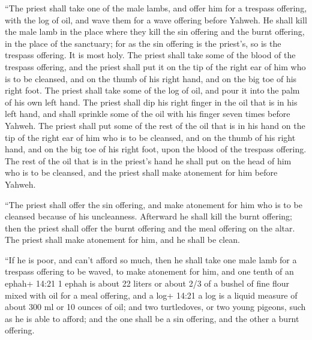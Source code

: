  ``The priest shall take one of the male lambs, and offer
him for a trespass offering, with the log of oil, and wave them for a
wave offering before Yahweh.  He shall kill the male lamb
in the place where they kill the sin offering and the burnt offering, in
the place of the sanctuary; for as the sin offering is the priest's, so
is the trespass offering. It is most holy.  The priest
shall take some of the blood of the trespass offering, and the priest
shall put it on the tip of the right ear of him who is to be cleansed,
and on the thumb of his right hand, and on the big toe of his right
foot.  The priest shall take some of the log of oil, and
pour it into the palm of his own left hand.  The priest
shall dip his right finger in the oil that is in his left hand, and
shall sprinkle some of the oil with his finger seven times before
Yahweh.  The priest shall put some of the rest of the oil
that is in his hand on the tip of the right ear of him who is to be
cleansed, and on the thumb of his right hand, and on the big toe of his
right foot, upon the blood of the trespass offering.  The
rest of the oil that is in the priest's hand he shall put on the head of
him who is to be cleansed, and the priest shall make atonement for him
before Yahweh.

 ``The priest shall offer the sin offering, and make
atonement for him who is to be cleansed because of his uncleanness.
Afterward he shall kill the burnt offering;  then the
priest shall offer the burnt offering and the meal offering on the
altar. The priest shall make atonement for him, and he shall be clean.

 ``If he is poor, and can't afford so much, then he shall
take one male lamb for a trespass offering to be waved, to make
atonement for him, and one tenth of an ephah+ 14:21 1 ephah is about 22
liters or about 2/3 of a bushel of fine flour mixed with oil for a meal
offering, and a log+ 14:21 a log is a liquid measure of about 300 ml or
10 ounces of oil;  and two turtledoves, or two young
pigeons, such as he is able to afford; and the one shall be a sin
offering, and the other a burnt offering.

